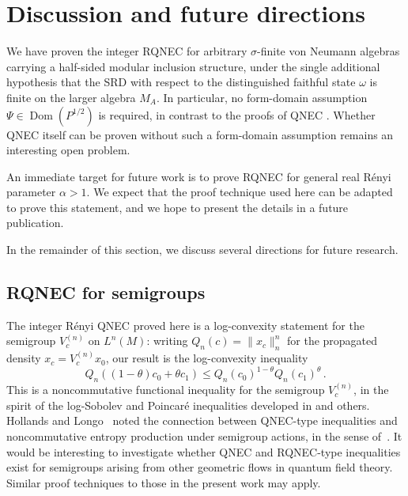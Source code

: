 \documentclass[11pt,a4paper]{article}
\theoremstyle{plain}
\numberwithin{theorem}{section}
\theoremstyle{definition}
\newcommand{\?}{\overset{?}{=}}
\renewcommand{\a}{\alpha}	%
\DeclareMathOperator{\Dom}{Dom}
\begin{document}

\section{Discussion and future directions}\label{Sec:conclusion}

We have proven the integer RQNEC for arbitrary $\sigma$-finite von Neumann algebras carrying a half-sided modular inclusion structure, under the single additional hypothesis that the SRD with respect to the distinguished faithful state $\omega$ is finite on the larger algebra $M_A$.  
In particular, no form-domain assumption $\Psi\in \Dom(P^{1/2})$ is required, in contrast to the proofs of QNEC \cite{Ceyhan:2018zfg,Hollands:2025glm}.
Whether QNEC itself can be proven without such a form-domain assumption remains an interesting open problem.

An immediate target for future work is to prove RQNEC for general real  R\'enyi parameter $\a>1$. We expect that the proof technique used here can be adapted to prove this statement, and we hope to present the details in a future publication.

In the remainder of this section, we discuss several directions for future research.

\subsection*{RQNEC for semigroups}

The integer R\'enyi QNEC proved here is a log-convexity statement for the semigroup $V_c^{(n)}$ on $L^n(M)$: writing $Q_n(c)=\|x_c\|_n^n$ for the propagated density $x_c=V_c^{(n)}x_0$, our result is the log-convexity inequality
\[
  Q_n((1-\theta)c_0+\theta c_1)\leq Q_n(c_0)^{1-\theta}Q_n(c_1)^\theta\,.
\]
This is a noncommutative functional inequality for the semigroup $V_c^{(n)}$, in the spirit of the log-Sobolev and Poincar\'e inequalities developed in \cite{olkiewicz1999hypercontractivity, junge2015noncommutative, carlen2017gradient} and others.
Hollands and Longo~\cite{Hollands:2025glm} noted the connection between QNEC-type inequalities and noncommutative entropy production under semigroup actions, in the sense of~\cite{Spohn:1978pfz, Wirth:2025goz}. 
It would be interesting to investigate whether QNEC and RQNEC-type inequalities exist for semigroups arising from other geometric flows in quantum field theory. Similar proof techniques to those in the present work may apply.
\end{document}
